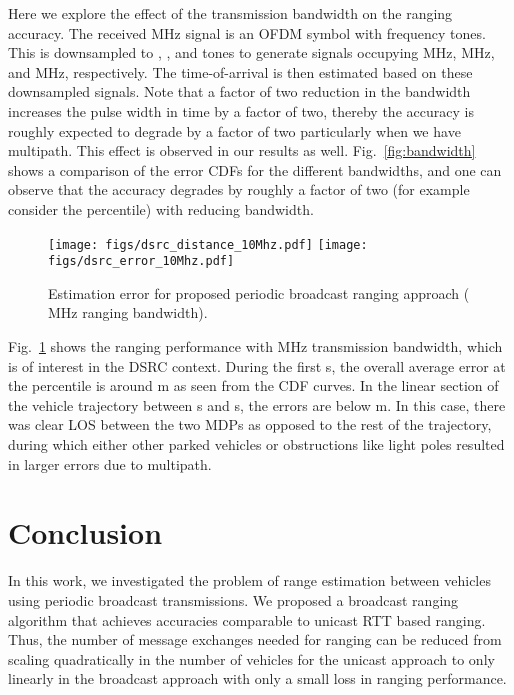 \documentclass[12pt,journal,final,onecolumn]{IEEEtran}
\theoremstyle{definition}
\theoremstyle{myremark}
\begin{document}
Here we explore the effect of the transmission bandwidth on the ranging
accuracy.  The received  MHz signal is an OFDM symbol with  frequency
tones. This is downsampled to , , and  tones to generate signals
occupying  MHz,  MHz, and  MHz, respectively. The time-of-arrival is
then estimated based on these downsampled signals. Note that a factor of two
reduction in the bandwidth increases the pulse width in time by a factor of two,
thereby the accuracy is roughly expected to degrade by a factor of two
particularly when we have multipath. This effect is observed in our results as
well.  Fig.~\ref{fig:bandwidth} shows a comparison of the error CDFs for the
different bandwidths, and one can observe that the accuracy degrades by roughly
a factor of two (for example consider the  percentile) with reducing
bandwidth.

\begin{figure}[htbp]
    \centering 
    \texttt{[image: figs/dsrc\_distance\_10Mhz.pdf]} 
    \texttt{[image: figs/dsrc\_error\_10Mhz.pdf]} 

    \caption{Estimation error for proposed periodic broadcast ranging approach ( MHz ranging
    bandwidth).}
    \label{fig:broadcast10}
\end{figure}

Fig.~\ref{fig:broadcast10} shows the ranging performance with  MHz
transmission bandwidth, which is of interest in the DSRC context. During the
first  s, the overall average error at the  percentile is around  m
as seen from the CDF curves.  In the linear section of the vehicle trajectory
between  s and  s, the errors are below  m. In this case, there was
clear LOS between the two MDPs as opposed to the rest of the trajectory, during
which either other parked vehicles or obstructions like light poles resulted in
larger errors due to multipath.  


\section{Conclusion}
\label{sec:conclusion}

In this work, we investigated the problem of range estimation between vehicles
using periodic broadcast transmissions. We proposed a broadcast ranging
algorithm that achieves accuracies comparable to unicast RTT based ranging.
Thus, the number of message exchanges needed for ranging can be reduced from
scaling quadratically in the number of vehicles for the unicast approach to only
linearly in the broadcast approach with only a small loss in ranging
performance.
\end{document}

